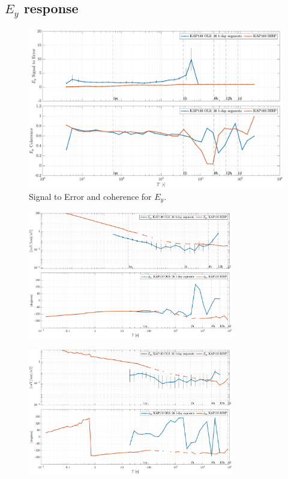 \documentclass{article}
\begin{document}
\clearpage

\subsection{$E_y$ response}

\begin{figure}[h!]
\centering
\includegraphics[width=\textwidth]{figures/KAP103/SN_compare-E_y.pdf}
\caption{Signal to Error and coherence for $E_y$.}
\label{fig:universe}
\end{figure}

\clearpage

\begin{figure}[h!]
\centering
\includegraphics[width=0.8\textwidth]{figures/KAP103/transferfnZ_compare-Z_yx_Magnitude_Phase.pdf}
\caption{}
\label{fig:universe}
\end{figure}

\begin{figure}[h!]
\centering
\includegraphics[width=0.8\textwidth]{figures/KAP103/transferfnZ_compare-Z_yy_Magnitude_Phase.pdf}
\caption{}
\label{fig:universe}
\end{figure}
\end{document}
